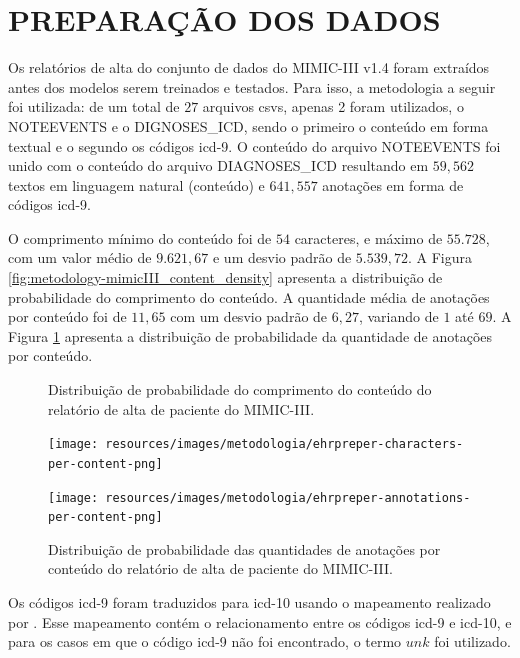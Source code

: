 \section{PREPARAÇÃO DOS DADOS}
\label{sec:results-preparation}

Os relatórios de alta do conjunto de dados do MIMIC-III v1.4 foram extraídos antes dos modelos serem treinados e testados. Para isso, a metodologia a seguir foi utilizada: de um total de $27$ arquivos \glspl{csv}, apenas 2 foram utilizados, o NOTEEVENTS e o DIGNOSES\_ICD, sendo o primeiro o conteúdo em forma textual e o segundo os códigos \gls{icd}-9. O conteúdo do arquivo NOTEEVENTS foi unido com o conteúdo do arquivo DIAGNOSES\_ICD resultando em $59,562$ textos em linguagem natural (conteúdo) e $641,557$ anotações em forma de códigos \gls{icd}-9.

O comprimento mínimo do conteúdo foi de $54$ caracteres, e máximo de $55.728$, com um valor médio de $9.621,67$ e um desvio padrão de $5.539,72$. A Figura \ref{fig:metodology-mimicIII_content_density} apresenta a distribuição de probabilidade do comprimento do conteúdo. A quantidade média de anotações por conteúdo  foi de $11,65$ com um desvio padrão de $6,27$, variando de $1$ até $69$. A Figura \ref{fig:metodology-mimicIII_annotation_density} apresenta a distribuição de probabilidade da quantidade de anotações por conteúdo.
\begin{figure}[htbp]
    \centering
    \begin{minipage}{0.49\textwidth}
        \centering
            \caption{Distribuição de probabilidade do comprimento do conteúdo do relatório de alta de paciente do MIMIC-III.}
            \texttt{[image: resources/images/metodologia/ehrpreper-characters-per-content-png]}
            \label{fig:metodology-mimicIII_content_density}
    \end{minipage} \hfill
    \begin{minipage}{0.49\textwidth}
        \centering
            \caption{Distribuição de probabilidade das quantidades de anotações por conteúdo do relatório de alta de paciente do MIMIC-III.}
            \texttt{[image: resources/images/metodologia/ehrpreper-annotations-per-content-png]}
            \label{fig:metodology-mimicIII_annotation_density}
    \end{minipage}
\end{figure}

Os códigos \gls{icd}-9 foram traduzidos para \gls{icd}-10 usando o mapeamento realizado por \textcite{Butler2007TheIG}. Esse mapeamento contém o relacionamento entre os códigos \gls{icd}-9 e \gls{icd}-10, e para os casos em que o código \gls{icd}-9 não foi encontrado, o termo $unk$ foi utilizado.

